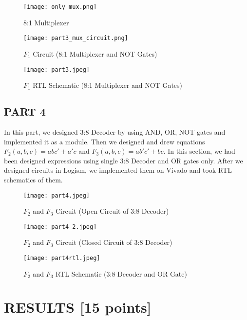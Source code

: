 \documentclass[pdftex,12pt,a4paper]{article}
\begin{document}
\begin{figure}[ht]
	\centering
	\texttt{[image: only mux.png]}	
	\caption{8:1 Multiplexer}
	\label{fig7}
\end{figure}

\begin{figure}[ht]
	\centering
	\texttt{[image: part3\_mux\_circuit.png]}	
	\caption{\(F_1\) Circuit (8:1 Multiplexer and NOT Gates)}
	\label{fig16}
\end{figure}

\begin{figure}[ht]
	\centering
	\texttt{[image: part3.jpeg]}	
	\caption{\(F_1\) RTL Schematic (8:1 Multiplexer and NOT Gates)}
	\label{fig8}
\end{figure}

\clearpage
\subsection{PART 4}
In this part, we designed 3:8 Decoder by using AND, OR, NOT gates and implemented it as a module. Then we designed and drew equations \(F_2(a, b, c) = abc' + a'c\) and \(F_3(a, b, c) = ab'c'+ bc\).
In this section, we had been designed expressions using single 3:8 Decoder and OR gates only.
After we designed circuits in Logism, we implemented them on Vivado and took RTL schematics of them.

\begin{figure}[ht]
	\centering
	\texttt{[image: part4.jpeg]}	
	\caption{\(F_2\) and \(F_3\) Circuit (Open Circuit of 3:8 Decoder)}
	\label{fig9}
\end{figure}

\begin{figure}[ht]
	\centering
	\texttt{[image: part4\_2.jpeg]}	
	\caption{\(F_2\) and \(F_3\) Circuit (Closed Circuit of 3:8 Decoder)}
	\label{fig10}
\end{figure}

\begin{figure}[ht]
	\centering
	\texttt{[image: part4rtl.jpeg]}	
	\caption{\(F_2\) and \(F_3\) RTL Schematic (3:8 Decoder and OR Gate)}
	\label{fig11}
\end{figure}

\clearpage

\section{RESULTS [15 points]}
\end{document}
